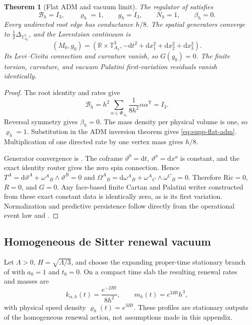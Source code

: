 \documentclass[11pt]{article}
\newtheorem{theorem}{Theorem}[section]
\theoremstyle{definition}
\theoremstyle{remark}
\newcommand{\R}{\mathbb R}
\newcommand{\dd}{\mathrm d}
\newcommand{\Ric}{\mathrm{Ric}}
\begin{document}
\begin{theorem}[Flat ADM and vacuum limit]
\label{thm:supp-flat-vacuum}
The regulator of  satisfies
\begin{equation}
 \boxed{
 \mathcal B_h=I_3,\qquad
 \varrho_h=1,\qquad
 g_h=I_3,\qquad N_h=1,\qquad\beta_h=0.}
 \label{eq:supp-flat-adm}
\end{equation}
Every undirected root edge has conductance $h/8$.  The spatial generators
converge to $\tfrac12\Delta_{\mathbb T^3_{A_3}}$, and the Lorentzian continuum
is
\begin{equation}
 \boxed{
 (M_0,g_0)=
 \left(\R\times\mathbb T^3_{A_3},
 -\dd t^2+\dd x_1^2+\dd x_2^2+\dd x_3^2\right).}
 \label{eq:supp-flat-lorentzian}
\end{equation}
Its Levi--Civita connection and curvature vanish, so
$G(g_0)=0$.  The finite torsion, curvature, and vacuum Palatini first-variation
residuals vanish identically.
\end{theorem}

\begin{proof}
The root identity and rates give
\[
 \mathcal B_h
 =h^2\sum_{\alpha\in\Phi_{A_3}}
   \frac1{8h^2}\alpha\alpha^{\mathsf T}=I_3.
\]
Reversal symmetry gives $\beta_h=0$.  The mass density per physical volume is
one, so $\varrho_h=1$.  Substitution in the ADM inversion theorem
 gives \eqref{eq:supp-flat-adm}.  Multiplication of
one directed rate by one vertex mass gives $h/8$.

Generator convergence is .  The coframe
$\vartheta^0=\dd t$, $\vartheta^a=\dd x^a$ is constant, and the exact identity
router gives the zero spin connection.  Hence
$T^A=\dd\vartheta^A+\omega^A{}_B\wedge\vartheta^B=0$ and
$\Omega^A{}_B=\dd\omega^A{}_B+\omega^A{}_C\wedge\omega^C{}_B=0$.
Therefore $\Ric=0$, $R=0$, and $G=0$.  Any face-based finite Cartan and
Palatini writer constructed from these exact constant data is identically zero,
as is its first variation.  Normalization and predictive persistence follow directly from the operational event law and .
\end{proof}

\subsection{Homogeneous de Sitter renewal vacuum}

Let $\Lambda>0$, $H=\sqrt{\Lambda/3}$, and choose the expanding proper-time
stationary branch of  with
$a_0=1$ and $t_0=0$.  On a compact time slab the resulting renewal rates and
masses are
\begin{equation}
 k_{\alpha,h}(t)=\frac{e^{-2Ht}}{8h^2},
 \qquad
 m_h(t)=e^{3Ht}h^3,
 \label{eq:supp-desitter-rates-mass}
\end{equation}
with physical speed density $\varrho_h(t)=e^{3Ht}$.  These profiles are
stationary outputs of the homogeneous renewal action, not assumptions made in
this appendix.
\end{document}
